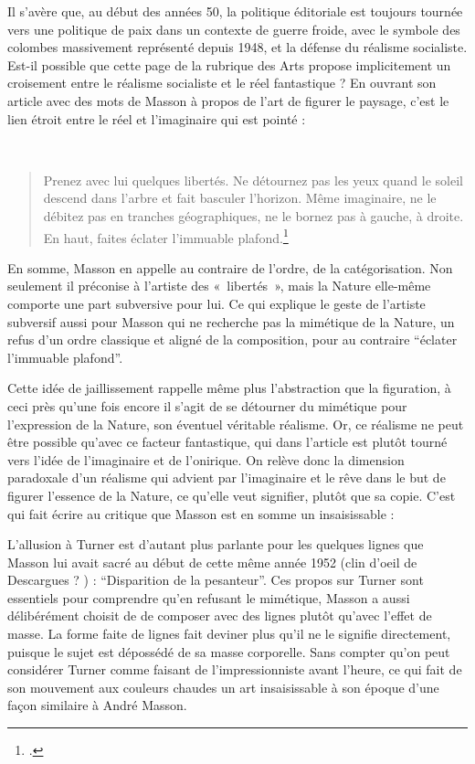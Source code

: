 	Il s'avère que, au début des années 50, la politique éditoriale est toujours tournée vers une politique de paix dans un contexte de guerre froide, avec le symbole des colombes massivement représenté depuis 1948, et la défense du réalisme socialiste. Est-il possible que cette page de la rubrique des Arts propose implicitement un croisement entre le réalisme socialiste et le réel fantastique ? En ouvrant son article avec des mots de Masson à propos de l’art de figurer le paysage, c’est le lien étroit entre le réel et l’imaginaire qui est pointé : 

 \begin{quote}
Prenez avec lui quelques libertés. Ne détournez pas les yeux quand le soleil descend dans l’arbre et fait basculer l’horizon. Même imaginaire, ne le débitez pas en tranches géographiques, ne le bornez pas à gauche, à droite. En haut, faites éclater l’immuable plafond.\footcite{reelfantastique}	
\end{quote}

	 En somme, Masson en appelle au contraire de l’ordre, de la catégorisation. Non seulement il préconise à l’artiste des « libertés », mais la Nature elle-même comporte une part subversive pour lui. Ce qui explique le geste de l’artiste subversif aussi pour Masson qui ne recherche pas la mimétique de la Nature, un refus d’un ordre classique et aligné de la composition, pour au contraire \enquote{éclater l’immuable plafond}.

	  Cette idée de jaillissement rappelle même plus l’abstraction que la figuration, à ceci près qu’une fois encore il s’agit de se détourner du mimétique pour l’expression de la Nature, son éventuel véritable réalisme. Or, ce réalisme ne peut être possible qu’avec ce facteur fantastique, qui dans l’article est plutôt tourné vers l’idée de l’imaginaire et de l’onirique. On relève donc la dimension paradoxale d’un réalisme qui advient par l’imaginaire et le rêve dans le but de figurer l’essence de la Nature, ce qu’elle veut signifier, plutôt que sa copie. C’est qui fait écrire au critique que Masson est en somme un insaisissable : 
 
L’allusion à Turner est d’autant plus parlante pour les quelques lignes que Masson lui avait sacré au début de cette même année 1952 (clin d’oeil de Descargues ? ) : \enquote{Disparition de la pesanteur}. Ces propos sur Turner sont essentiels pour comprendre qu’en refusant le mimétique, Masson a aussi délibérément choisit de de composer avec des lignes plutôt qu’avec l’effet de masse. La forme faite de lignes fait deviner plus qu’il ne le signifie directement, puisque le sujet est dépossédé de sa masse corporelle. Sans compter qu’on peut considérer Turner comme faisant de l’impressionniste avant l’heure, ce qui fait de son mouvement aux couleurs chaudes un art insaisissable à son époque d’une façon similaire à André Masson. 

